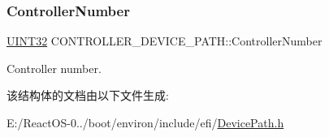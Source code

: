 \subsubsection{\texorpdfstring{Controller\+Number}{ControllerNumber}}
{\footnotesize\ttfamily \hyperlink{_processor_bind_8h_ae1e6edbbc26d6fbc71a90190d0266018}{U\+I\+N\+T32} C\+O\+N\+T\+R\+O\+L\+L\+E\+R\+\_\+\+D\+E\+V\+I\+C\+E\+\_\+\+P\+A\+T\+H\+::\+Controller\+Number}

Controller number. 

该结构体的文档由以下文件生成\+:\begin{DoxyCompactItemize}
\item 
E\+:/\+React\+O\+S-\/0../boot/environ/include/efi/\hyperlink{_device_path_8h}{Device\+Path.\+h}\end{DoxyCompactItemize}
